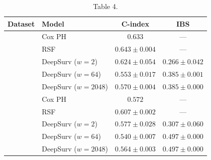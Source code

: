 \documentclass[12pt]{article}
\begin{document}
\begin{table}[ht]
\centering
\caption{Table 4. }
\label{tab:realdata}
\begin{tabular}{llcc}
\toprule
\textbf{Dataset} & \textbf{Model} & \textbf{C-index} & \textbf{IBS} \\
\midrule
{}
& Cox PH & $0.633$ & --- \\
& RSF & $0.643 \pm 0.004$ & --- \\
& DeepSurv ($w=2$) & $0.624 \pm 0.054$ & $0.266 \pm 0.042$ \\
& DeepSurv ($w=64$) & $0.553 \pm 0.017$ & $0.385 \pm 0.001$ \\
& DeepSurv ($w=2048$) & $0.570 \pm 0.004$ & $0.385 \pm 0.000$ \\
\midrule
{}
& Cox PH & $0.572$ & --- \\
& RSF & $0.607 \pm 0.002$ & --- \\
& DeepSurv ($w=2$) & $0.577 \pm 0.028$ & $0.307 \pm 0.060$ \\
& DeepSurv ($w=64$) & $0.540 \pm 0.007$ & $0.497 \pm 0.000$ \\
& DeepSurv ($w=2048$) & $0.564 \pm 0.003$ & $0.497 \pm 0.000$ \\
\bottomrule
\end{tabular}
\end{table}
\end{document}
